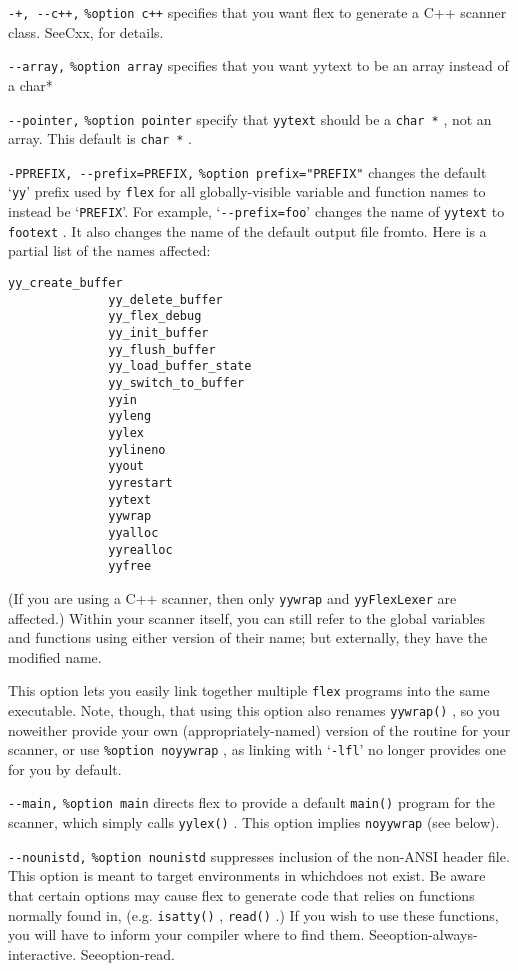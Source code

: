 \documentclass[openany,oneside]{book}
\begin{document}
\verb`-+, --c++,` \verb`%option c++` specifies that you want flex to generate a C++
scanner class.  SeeCxx, for
details.

\verb`--array,` \verb`%option array` specifies that you want yytext to be an array instead of a char*

\verb`--pointer,` \verb`%option pointer` specify that \verb`yytext` should be a \verb`char *` , not an array. 
This default is \verb`char *` .

\verb`-PPREFIX, --prefix=PREFIX,` \verb`%option prefix="PREFIX"` changes the default ‘\verb`yy`’ prefix used by \verb`flex` for all
globally-visible variable and function names to instead be
‘\verb`PREFIX`’.  For example, ‘\verb`--prefix=foo`’ changes the name of \verb`yytext` to \verb`footext` .  It also changes the name of the default
output file fromto.  Here is a partial
list of the names affected:
\begin{verbatim}
yy_create_buffer
              yy_delete_buffer
              yy_flex_debug
              yy_init_buffer
              yy_flush_buffer
              yy_load_buffer_state
              yy_switch_to_buffer
              yyin
              yyleng
              yylex
              yylineno
              yyout
              yyrestart
              yytext
              yywrap
              yyalloc
              yyrealloc
              yyfree
\end{verbatim}


(If you are using a C++ scanner, then only \verb`yywrap` and \verb`yyFlexLexer` are affected.)  Within your scanner itself, you can
still refer to the global variables and functions using either version
of their name; but externally, they have the modified name.

This option lets you easily link together multiple \verb`flex` programs into the same executable.  Note, though, that using this
option also renames \verb`yywrap()` ,
so you noweither
provide your own (appropriately-named) version of the routine for your
scanner, or use \verb`%option noyywrap` ,
as linking with
‘\verb`-lfl`’
no longer provides one for you by default.

\verb`--main,` \verb`%option main` directs flex to provide a default \verb`main()` program for the
scanner, which simply calls \verb`yylex()` .  This option implies \verb`noyywrap` (see below).

\verb`--nounistd,` \verb`%option nounistd` suppresses inclusion of the non-ANSI header file. This option
is meant to target environments in whichdoes not exist. Be aware
that certain options may cause flex to generate code that relies on functions
normally found in, (e.g. \verb`isatty()` , \verb`read()` .) 
If you wish to use these functions, you will have to inform your compiler where
to find them. 
Seeoption-always-interactive. Seeoption-read.
\end{document}
